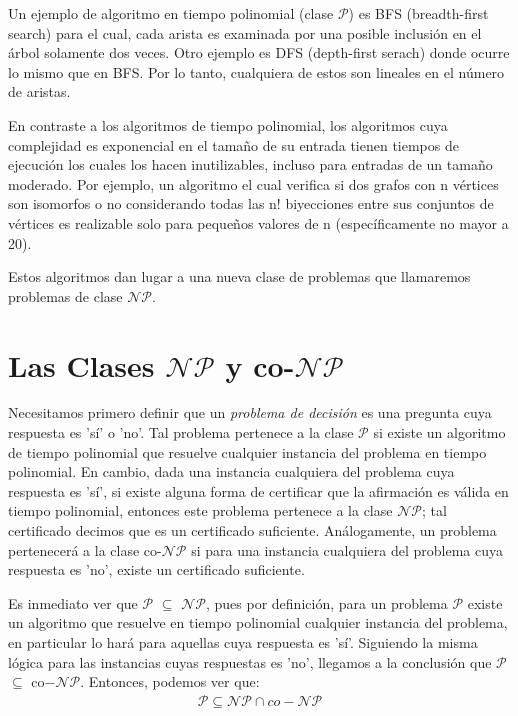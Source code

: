 \documentclass{article}
\begin{document}
Un ejemplo de algoritmo en tiempo polinomial (clase $\mathcal{P}$)
es BFS (breadth-first search) para el cual, cada arista es examinada por una posible
inclusión en el árbol solamente dos veces. Otro ejemplo es DFS (depth-first serach)
donde ocurre lo mismo que en BFS. Por lo tanto, cualquiera de estos son
lineales en el número de aristas.

En contraste a los algoritmos de tiempo polinomial, los
algoritmos cuya complejidad es exponencial en el tamaño de su
entrada tienen tiempos de ejecución los cuales los hacen inutilizables,
incluso para entradas de un tamaño moderado. Por ejemplo, un algoritmo
el cual verifica si dos grafos con n vértices son isomorfos o no 
considerando todas las n! biyecciones entre sus conjuntos de vértices es
realizable solo para pequeños valores de n (específicamente no mayor a 20).

Estos algoritmos dan lugar a una nueva clase de problemas que llamaremos
problemas de clase $\mathcal{NP}$.

\section*{Las Clases $\mathcal{NP}$ y co-$\mathcal{NP}$}
Necesitamos primero definir que un \textit{problema de decisión}
es una pregunta cuya respuesta es 'sí' o 'no'. Tal problema pertenece
a la clase $\mathcal{P}$ si existe un algoritmo de tiempo
polinomial que resuelve cualquier instancia del problema en tiempo
polinomial. En cambio, dada una instancia
cualquiera del problema cuya respuesta es 'sí', si existe alguna forma de 
certificar que la afirmación es válida en tiempo polinomial, entonces este problema
pertenece a la clase $\mathcal{NP}$; tal certificado decimos
que es un certificado suficiente. Análogamente,
un problema pertenecerá a la clase co-$\mathcal{NP}$ si para
una instancia cualquiera del problema cuya respuesta es 'no', existe un
certificado suficiente.

Es inmediato ver que 
$\mathcal{P}$ $\subseteq$ \textit{$\mathcal{NP}$},
pues por definición, para un problema $\mathcal{P}$ existe
un algoritmo que resuelve en tiempo polinomial cualquier instancia
del problema, en particular lo hará para aquellas cuya respuesta es
'sí'. Siguiendo la misma lógica para las instancias cuyas respuestas
es 'no', llegamos a la conclusión que $\mathcal{P}$
$\subseteq$ co$-\mathcal{NP}$. Entonces, podemos
ver que:
\begin{align*}
    \mathcal{P} \subseteq \mathcal{NP}
    \cap co-\mathcal{NP}
\end{align*}
\end{document}
